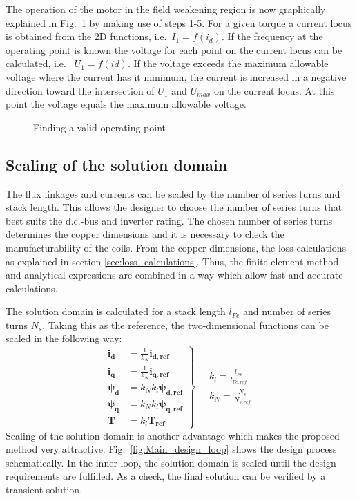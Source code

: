 The operation of the motor in the field weakening region is now graphically explained in Fig.~\ref{fig:f_locus} by making use of steps 1-5. For a given torque a current locus is obtained from the 2D functions, i.e.~$I_1 = f(i_d)$. If the frequency at the operating point is known the voltage for each point on the current locus can be calculated, i.e.~%
$U_1 = f(id)$. If the voltage exceeds the maximum allowable voltage where the current has it minimum, the current is increased in a negative direction toward the intersection of $U_1$ and $U_{max}$ on the current locus. At this point the voltage equals the maximum allowable voltage.
\begin{figure}
	\centering
		
	\caption{Finding a valid operating point}
	\label{fig:f_locus}
\end{figure}

\subsection{Scaling of the solution domain}
The flux linkages and currents can be scaled by the number of series turns and stack length. This allows the designer to choose the number of series turns that best suits the d.c.-bus and inverter rating. The chosen number of series turns determines the copper dimensions and it is necessary to check the manufacturability of the coils. From the copper dimensions, the loss calculations as explained in section \ref{sec:loss_calculations}. Thus, the finite element method and analytical expressions are combined in a way which allow fast and accurate calculations. 

The solution domain is calculated for a stack length $l_{Fe}$ and number of series turns $N_s$. Taking this as the reference, the two-dimensional functions can be scaled in the following way:
\begin{equation}
  \label{eqn:2D_func}
  \left.
   \begin{aligned}
     \mathbf{i_d}    &= \frac{1}{k_N}\mathbf{i_{d,ref}} \\
     \mathbf{i_q}    &= \frac{1}{k_N}\mathbf{i_{q,ref}} \\
     \mathbf{\psi_d} &= k_N k_l\mathbf{\psi_{d,ref}}    \\
     \mathbf{\psi_q} &= k_N k_l\mathbf{\psi_{q,ref}}    \\
     \mathbf{T}      &= k_l\mathbf{T_{ref}}
   \end{aligned}
   \right\}  
   \quad
   \begin{aligned}
    k_l = \frac{l_{Fe}}{l_{Fe,ref}} \\
    k_N = \frac{N_s}{N_{s,ref}} 
  \end{aligned}
\end{equation}
Scaling of the solution domain is another advantage which makes the proposed method very attractive. Fig.~\ref{fig:Main_design_loop} shows the design process schematically. In the inner loop, the solution domain is scaled until the design requirements are fulfilled. As a check, the final solution can be verified by a transient solution.  

